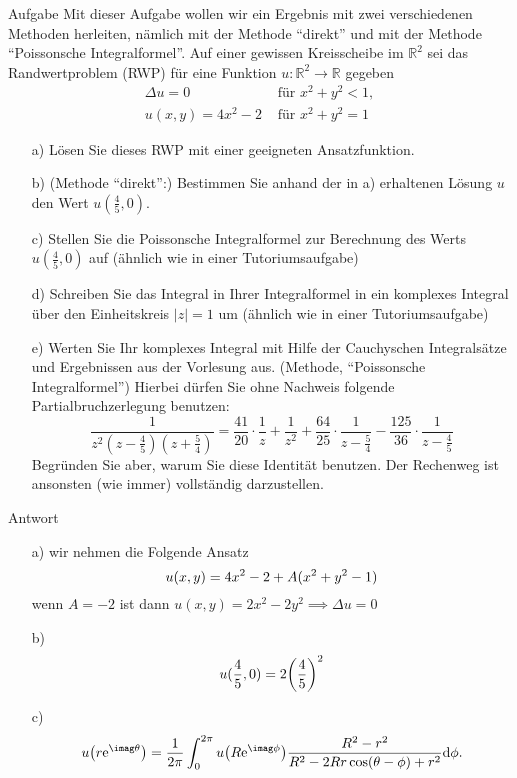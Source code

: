 \documentclass{scrartcl}
\begin{document}
\begin{section}{Aufgabe}
Mit dieser Aufgabe wollen wir ein Ergebnis mit zwei verschiedenen Methoden herleiten,
nämlich mit der Methode \enquote{direkt} und mit der Methode \enquote{Poissonsche Integralformel}.
Auf einer gewissen Kreisscheibe im \( \mathbb{R}^{2} \) sei das Randwertproblem (RWP) für eine Funktion \( u: \mathbb{R}^{2} \rightarrow \mathbb{R} \) gegeben 
\[ \begin{array}{ll} \Delta u=0 & \text { für } x^{2}+y^{2}<1, \\ u(x, y)=4 x^{2}-2 & \text { für } x^{2}+y^{2}=1 \end{array} \] 
\begin{itemize}
\item[a)]Lösen Sie dieses RWP mit einer geeigneten Ansatzfunktion. 
\item[b)] (Methode \enquote{direkt}:) Bestimmen Sie anhand der in a) erhaltenen Lösung \( u \) den Wert \( u\left(\frac{4}{5}, 0\right) \). 
\item[c)] Stellen Sie die Poissonsche Integralformel zur Berechnung des Werts \( u\left(\frac{4}{5}, 0\right) \) auf (ähnlich wie in einer Tutoriumsaufgabe) 
\item[d)] Schreiben Sie das Integral in Ihrer Integralformel in ein komplexes Integral über den Einheitskreis \( |z|=1 \) um (ähnlich wie in einer Tutoriumsaufgabe) 
\item[e)]  Werten Sie Ihr komplexes Integral mit Hilfe der Cauchyschen Integralsätze und Ergebnissen aus der Vorlesung aus. (Methode, \enquote{Poissonsche Integralformel}) Hierbei dürfen Sie ohne Nachweis folgende Partialbruchzerlegung benutzen: 
\[\frac{1}{z^{2}\left(z-\frac{4}{5}\right)\left(z+\frac{5}{4}\right)}=\frac{41}{20} \cdot \frac{1}{z}+\frac{1}{z^{2}}+\frac{64}{25} \cdot \frac{1}{z-\frac{5}{4}}-\frac{125}{36} \cdot \frac{1}{z-\frac{4}{5}}\]
Begründen Sie aber, warum Sie diese Identität benutzen. Der Rechenweg ist ansonsten (wie immer) vollständig darzustellen.
\end{itemize}
      \begin{subsection}{Antwort}
\begin{itemize}
\item[a)]
wir nehmen die Folgende Ansatz 
\[u\qty(x,y)=4x^2-2+A(x^2+y^2-1)\]
wenn $A=-2$ ist dann $u(x,y)=2x^2-2y^2\implies \Delta u =0$
\item[b)] 
\[u(\frac{4}{5},0)=2\qty(\frac{4}{5})^2\] 
\item[c)]  
\[u\qty(r \mathrm{e}^{\imag \theta})=\frac{1}{2\pi}\int_0^{2\pi} u\qty(R \mathrm{e}^{\imag \phi}) \frac{R^2-r^2}{R^2 -2R r \cos(\theta-\phi)+r^2}\dd \phi. \]

\end{itemize}
\end{subsection}
\end{section}
\end{document}
